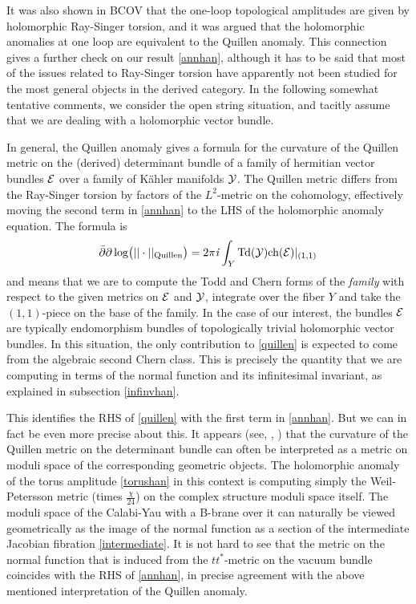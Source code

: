 It was also shown in BCOV that the one-loop topological amplitudes
are given by holomorphic Ray-Singer torsion, and it was argued that 
the holomorphic anomalies at one loop are equivalent to the Quillen 
anomaly. This connection gives a further check on our result 
\eqref{annhan}, although it has to be said that most of the issues
related to Ray-Singer torsion have apparently not been studied for the 
most general objects in the derived category. In the following somewhat
tentative comments, we consider the open string situation, and tacitly 
assume that we are dealing with a holomorphic vector bundle.

In general, the Quillen anomaly gives a formula for the curvature
of the Quillen metric on the (derived) determinant bundle of a
family of hermitian vector bundles ${\cal E}$ over a family of K\"ahler 
manifolds ${\cal Y}$. The Quillen metric differs from the Ray-Singer torsion 
by factors of the $L^2$-metric on the cohomology, effectively moving 
the second term in \eqref{annhan} to the LHS of the holomorphic anomaly 
equation. The formula is \cite{bismut}
\begin{equation}
\eqlabel{quillen}
\delbar\del \log \bigl(||\cdot||_{\rm Quillen} \bigr) = 
2\pi\ii \int_Y \td(\caly) \ch(\cale)|_{(1,1)}
\end{equation}
and means that we are to compute the Todd and Chern forms of the
{\it family} with respect to the given metrics on ${\cal E}$ and ${\cal Y}$,
integrate over the fiber $Y$ and take the $(1,1)$-piece on the base of
the family. In the case of our interest, the bundles ${\cal E}$ are
typically endomorphism bundles of topologically trivial holomorphic
vector bundles. In this situation, the only contribution to
\eqref{quillen} is expected to come from the algebraic second Chern 
class. This is precisely the quantity that we are computing in terms 
of the normal function and its infinitesimal invariant, as explained 
in subsection \ref{infinvhan}.

This identifies the RHS of \eqref{quillen} with the first
term in \eqref{annhan}. But we can in fact be even more precise about 
this. It appears (see, \eg, \cite{schumacher,fang}) that the curvature 
of the Quillen metric on the determinant bundle can often be interpreted 
as a metric on moduli space of the corresponding geometric objects. The 
holomorphic anomaly of the torus amplitude \eqref{torushan} in this context
is computing simply the Weil-Petersson metric (times $\frac{\chi}{24}$) on 
the complex structure moduli space itself. The moduli space of the 
Calabi-Yau with a B-brane over it can naturally be viewed 
geometrically as the image of the normal function as a section of
the intermediate Jacobian fibration \eqref{intermediate}. It is not 
hard to see that the metric on the normal function that is induced 
from the $tt^*$-metric on the vacuum bundle coincides with the RHS 
of \eqref{annhan}, in precise agreement with the above mentioned
interpretation of the Quillen anomaly.


